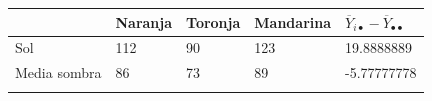 \documentclass[]{book}
\theoremstyle{definition}
\theoremstyle{definition}
\theoremstyle{definition}
\theoremstyle{remark}
\begin{document}
\begin{longtable}[]{@{}lllll@{}}
\toprule
\begin{minipage}[b]{0.18\columnwidth}\raggedright
\strut
\end{minipage} & \begin{minipage}[b]{0.06\columnwidth}\raggedright
Naranja\strut
\end{minipage} & \begin{minipage}[b]{0.07\columnwidth}\raggedright
Toronja\strut
\end{minipage} & \begin{minipage}[b]{0.06\columnwidth}\raggedright
Mandarina\strut
\end{minipage} & \begin{minipage}[b]{0.49\columnwidth}\raggedright
\(\overline{Y}_{i \bullet} - \overline{Y}_{\bullet \bullet}\)\strut
\end{minipage}\tabularnewline
\midrule
\endhead
\begin{minipage}[t]{0.18\columnwidth}\raggedright
Sol\strut
\end{minipage} & \begin{minipage}[t]{0.06\columnwidth}\raggedright
112\strut
\end{minipage} & \begin{minipage}[t]{0.07\columnwidth}\raggedright
90\strut
\end{minipage} & \begin{minipage}[t]{0.06\columnwidth}\raggedright
123\strut
\end{minipage} & \begin{minipage}[t]{0.49\columnwidth}\raggedright
19.8888889\strut
\end{minipage}\tabularnewline
\begin{minipage}[t]{0.18\columnwidth}\raggedright
Media sombra\strut
\end{minipage} & \begin{minipage}[t]{0.06\columnwidth}\raggedright
86\strut
\end{minipage} & \begin{minipage}[t]{0.07\columnwidth}\raggedright
73\strut
\end{minipage} & \begin{minipage}[t]{0.06\columnwidth}\raggedright
89\strut
\end{minipage} & \begin{minipage}[t]{0.49\columnwidth}\raggedright
-5.77777778\strut
\end{minipage}\tabularnewline
\begin{minipage}[t]{0.18\columnwidth}\raggedright

\end{minipage}
\end{longtable}
\end{document}
